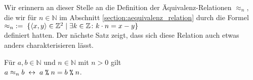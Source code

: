\noindent
Wir erinnern an dieser Stelle an die Definition der \"{A}quivalenz-Relationen $\approx_n$, die wir f\"{u}r 
$n \in \mathbb{N}$ im Abschnitt \ref{section:aequivalenz_relation} durch die Formel
\\[0.2cm]
\hspace*{1.3cm}
 $\approx_n \;:=\; \{ \pair(x,y) \in \mathbb{Z}^2 \mid \exists k \in \mathbb{Z} \colon k \cdot n = x - y \}$
\\[0.2cm]
definiert hatten.  Der n\"{a}chste Satz zeigt, dass sich diese Relation auch etwas anders charakterisieren
l\"{a}sst. 

\begin{Satz}
F\"{u}r $a,b \in \mathbb{N}$ und $n \in \mathbb{N}$ mit $n > 0$ gilt
\\[0.2cm]
\hspace*{1.3cm}
$a \approx_n b \;\leftrightarrow\; a \;\texttt{\%}\; n = b \;\texttt{\%}\; n$.
\end{Satz}
  
